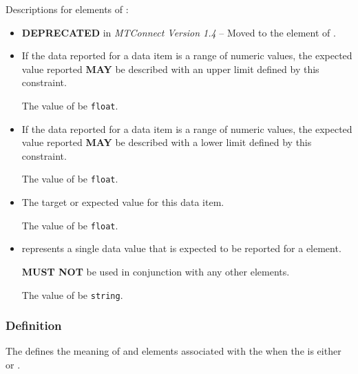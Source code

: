 Descriptions for elements of :

\begin{itemize}

\item {} \newline \textbf{DEPRECATED} in \textit{MTConnect Version 1.4} – Moved to the
 element of .

\item {} \newline If the data reported for a data item is a range of numeric values, the expected value reported \textbf{MAY} be described with an upper limit defined by this constraint.

The value of  \MUST be \texttt{float}.

\item {} \newline If the data reported for a data item is a range of numeric values, the expected value reported \textbf{MAY} be described with a lower limit defined by this constraint.

The value of  \MUST be \texttt{float}.

\item {} \newline The target or expected value for this data item.

The value of  \MUST be \texttt{float}.

\item {} \newline {} represents a single data value that is expected to be reported for a  element.

 \textbf{MUST NOT} be used in conjunction with any other  elements.

The value of  \MUST be \texttt{string}.
\end{itemize}



\subsubsection{Definition}
\label{sec:Definition}



The  defines the meaning of  and  elements associated with the  when the  is either  or .


